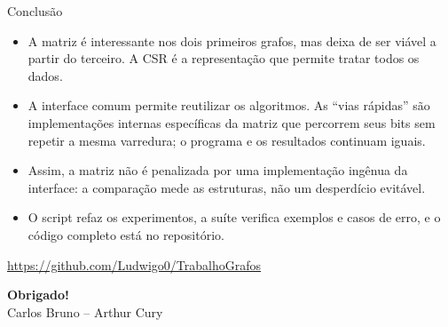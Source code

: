 \documentclass[10pt]{beamer}
\begin{document}
\begin{frame}{Conclus\~ao}
\begin{itemize}
\item A matriz \'e interessante nos dois primeiros grafos, mas deixa de ser
vi\'avel a partir do terceiro. A CSR \'e a representa\c c\~ao que permite tratar
todos os dados.
\item A interface comum permite reutilizar os algoritmos. As ``vias r\'apidas''
s\~ao implementa\c c\~oes internas espec\'ificas da matriz que percorrem seus
bits sem repetir a mesma varredura; o programa e os resultados continuam iguais.
\item Assim, a matriz n\~ao \'e penalizada por uma implementa\c c\~ao ing\^enua
da interface: a compara\c c\~ao mede as estruturas, n\~ao um desperd\'icio evit\'avel.
\item O script refaz os experimentos, a suíte verifica exemplos e casos de
erro, e o c\'odigo completo est\'a no reposit\'orio.
\end{itemize}
\begin{center}
\url{https://github.com/Ludwigo0/TrabalhoGrafos}
\end{center}
\end{frame}

\begin{frame}[plain]
\begin{center}
\vfill
{\Huge \textbf{Obrigado!}}\\[12pt]
Carlos Bruno \quad -- \quad Arthur Cury
\vfill
\end{center}
\end{frame}
\end{document}
